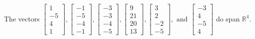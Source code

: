 \begin{exercise}
\begin{exerciseStatement}
  \end{exerciseStatement}
  \begin{exerciseAnswer}
   The vectors \(\left[\begin{array}{r}
1 \\
-5 \\
4 \\
1
\end{array}\right] , \left[\begin{array}{r}
-1 \\
-5 \\
-4 \\
-1
\end{array}\right] , \left[\begin{array}{r}
-3 \\
-3 \\
-4 \\
-5
\end{array}\right] , \left[\begin{array}{r}
9 \\
21 \\
20 \\
13
\end{array}\right] , \left[\begin{array}{r}
3 \\
2 \\
-2 \\
-5
\end{array}\right] , \text{ and } \left[\begin{array}{r}
-3 \\
4 \\
-5 \\
4
\end{array}\right]\) 
  	 do  
	span \(\mathbb{R}^4\).
  


  \end{exerciseAnswer}
\end{exercise}